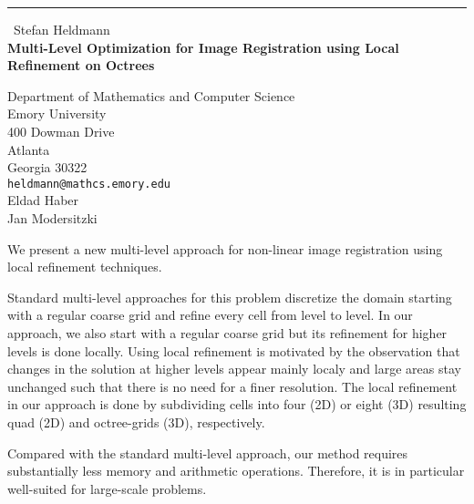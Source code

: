 \documentclass{report}
\begin{document}
\begin{center}
\rule{6in}{1pt} \
{\large Stefan Heldmann \\
{\bf Multi-Level Optimization for Image Registration using Local Refinement on Octrees }}

Department of Mathematics and Computer Science \\ Emory University \\ 400 Dowman Drive \\ Atlanta \\ Georgia 30322
\\
{\tt heldmann@mathcs.emory.edu}\\
Eldad Haber\\
Jan Modersitzki\end{center}

We present a new multi-level approach for non-linear image registration using
local refinement techniques.

Standard multi-level approaches for this problem discretize the domain
starting with a regular coarse grid and refine every cell from level to
level. In our approach, we also start with a regular coarse grid but its
refinement for higher levels is done locally. Using local refinement is
motivated by the observation that changes in the solution at higher levels
appear mainly localy and large areas stay unchanged such that there is no need
for a finer resolution. The local refinement in our approach is done by
subdividing cells into four (2D) or eight (3D) resulting quad (2D) and
octree-grids (3D), respectively.

Compared with the standard multi-level approach, our method requires
substantially less memory and arithmetic operations. Therefore, it is in
particular well-suited for large-scale problems.
\end{document}
